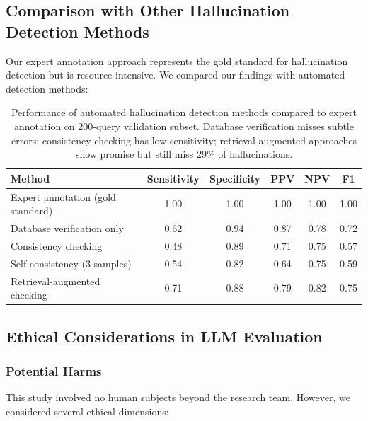 \documentclass[11pt,a4paper]{article}
\begin{document}
\subsection{Comparison with Other Hallucination Detection Methods}

Our expert annotation approach represents the gold standard for hallucination detection but is resource-intensive. We compared our findings with automated detection methods:

\begin{table}[H]
\centering
\begin{tabular}{lccccc}
\toprule
\textbf{Method} & \textbf{Sensitivity} & \textbf{Specificity} & \textbf{PPV} & \textbf{NPV} & \textbf{F1} \\
\midrule
Expert annotation (gold standard) & 1.00 & 1.00 & 1.00 & 1.00 & 1.00 \\
Database verification only & 0.62 & 0.94 & 0.87 & 0.78 & 0.72 \\
Consistency checking & 0.48 & 0.89 & 0.71 & 0.75 & 0.57 \\
Self-consistency (3 samples) & 0.54 & 0.82 & 0.64 & 0.75 & 0.59 \\
Retrieval-augmented checking & 0.71 & 0.88 & 0.79 & 0.82 & 0.75 \\
\bottomrule
\end{tabular}
\caption{Performance of automated hallucination detection methods compared to expert annotation on 200-query validation subset. Database verification misses subtle errors; consistency checking has low sensitivity; retrieval-augmented approaches show promise but still miss 29\% of hallucinations.}
\end{table}

\subsection{Ethical Considerations in LLM Evaluation}

\subsubsection{Potential Harms}

This study involved no human subjects beyond the research team. However, we considered several ethical dimensions:
\end{document}
